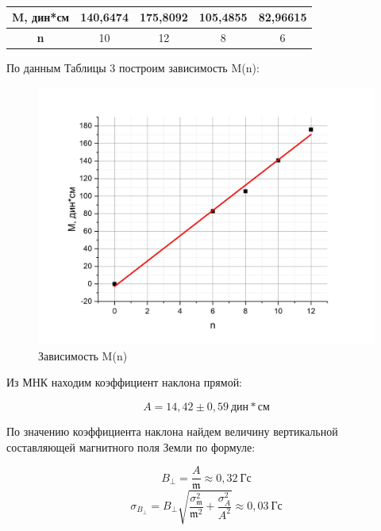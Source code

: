 \documentclass[a4paper,12pt]{article}
\begin{document}
\begin{table}[h]
\begin{center}
\caption{}
\begin{tabular}{|c|c|c|c|c|}
\hline
\textbf{M, дин*см} & 140,6474 & 175,8092 & 105,4855 & 82,96615 \\ \hline
\textbf{n}         & 10       & 12       & 8        & 6        \\ \hline
\end{tabular}
\end{center}
\end{table}

По данным Таблицы 3 построим зависимость M(n):

\begin{figure}[h]

\begin{center}

\includegraphics[width = 15 cm]{graph2}
\caption{Зависимость M(n)}
\end{center}
\end{figure}

Из МНК находим коэффициент наклона прямой:

$$
	A = 14,42 \pm 0,59 \ дин*см
$$

\newpage

По значению коэффициента наклона найдем величину вертикальной составляющей магнитного поля Земли по формуле:

$$
	B_{\perp} = \frac{A}{\mathfrak{m}} \approx 0,32 \ Гс
$$	
$$	 
	\sigma_{B_{\perp}} = B_{\perp} \sqrt{\frac{\sigma_{\mathfrak{m}}^2}{\mathfrak{m}^2} + \frac{\sigma_A^2}{A^2}} \approx 0,03 \ Гс
$$
\end{document}
